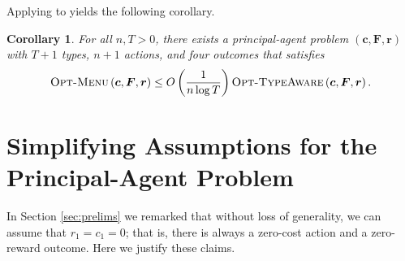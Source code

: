 \documentclass{article}
\newtheorem{corollary}[theorem]{Corollary}
\newcommand{\costvector}{\bm{c}}
\newcommand{\ForecastTensor}{\bm{F}}
\newcommand{\rewardvector}{\bm{r}}
\newcommand{\PrincipalAgentProblem}{\left(\costvector, \ForecastTensor, \rewardvector\right)}
\newcommand{\OTypeAware}{\textsc{Opt-TypeAware}}
\newcommand{\OMenu}{\textsc{Opt-Menu}}
\begin{document}
Applying  to  yields the following corollary.

\begin{corollary}
\label{cor:info-is-power}
For all $n, T > 0$, there exists a principal-agent problem $\PrincipalAgentProblem$ with $T+1$ types, $n+1$ actions, and four outcomes that satisfies
\begin{align*}
  \OMenu \PrincipalAgentProblem \le O\left( \frac{1}{n \log T} \right) \OTypeAware \PrincipalAgentProblem
  \text{.}
\end{align*}
\end{corollary}%




\appendix


\section{Simplifying Assumptions for the Principal-Agent Problem}
\label{subsec:simplifying}


In Section \ref{sec:prelims} we remarked that without loss of generality, we can assume that $r_{1} = c_{1} = 0$; that is, there is always a zero-cost action and a zero-reward outcome. Here we justify these claims.
\end{document}

